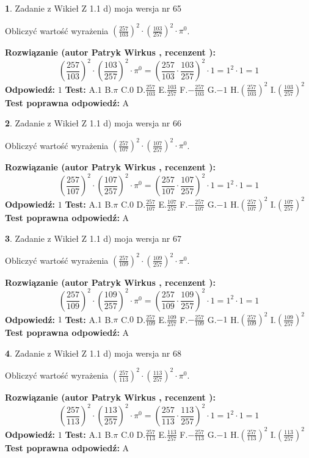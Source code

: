 \documentclass[12pt, a4paper]{article}
\theoremstyle{definition} %
\newtheorem{zad}{}
\newcommand{\zadStart}[1]{\begin{zad}#1\newline}
\newcommand{\zadStop}{\end{zad}}
\newcommand{\rozwStart}[2]{\noindent \textbf{Rozwiązanie (autor #1 , recenzent #2): }\newline}
\newcommand{\rozwStop}{\newline}
\newcommand{\odpStart}{\noindent \textbf{Odpowiedź:}\newline}
\newcommand{\odpStop}{\newline}
\newcommand{\testStart}{\noindent \textbf{Test:}\newline}
\newcommand{\testStop}{\newline}
\newcommand{\kluczStart}{\noindent \textbf{Test poprawna odpowiedź:}\newline}
\newcommand{\kluczStop}{\newline}
\begin{document}
\zadStart{Zadanie z Wikieł Z 1.1 d) moja wersja nr 65}

Obliczyć wartość wyrażenia $(\frac{257}{103})^{2} \cdot (\frac{103}{257})^{2} \cdot \pi^{0}$.
\zadStop
\rozwStart{Patryk Wirkus}{}
$$(\frac{257}{103})^{2} \cdot (\frac{103}{257})^{2} \cdot \pi^{0} = (\frac{257}{103} \cdot \frac{103}{257})^{2} \cdot 1 = 1^{2} \cdot 1 = 1$$
\rozwStop
\odpStart
$1$
\odpStop
\testStart
A.$1$ B.$\pi$ C.$0$ D.$\frac{257}{103}$ E.$\frac{103}{257}$
F.$-\frac{257}{103}$ G.$-1$
H.$(\frac{257}{103})^{2}$
I.$(\frac{103}{257})^{2}$
\testStop
\kluczStart
A
\kluczStop



\zadStart{Zadanie z Wikieł Z 1.1 d) moja wersja nr 66}

Obliczyć wartość wyrażenia $(\frac{257}{107})^{2} \cdot (\frac{107}{257})^{2} \cdot \pi^{0}$.
\zadStop
\rozwStart{Patryk Wirkus}{}
$$(\frac{257}{107})^{2} \cdot (\frac{107}{257})^{2} \cdot \pi^{0} = (\frac{257}{107} \cdot \frac{107}{257})^{2} \cdot 1 = 1^{2} \cdot 1 = 1$$
\rozwStop
\odpStart
$1$
\odpStop
\testStart
A.$1$ B.$\pi$ C.$0$ D.$\frac{257}{107}$ E.$\frac{107}{257}$
F.$-\frac{257}{107}$ G.$-1$
H.$(\frac{257}{107})^{2}$
I.$(\frac{107}{257})^{2}$
\testStop
\kluczStart
A
\kluczStop



\zadStart{Zadanie z Wikieł Z 1.1 d) moja wersja nr 67}

Obliczyć wartość wyrażenia $(\frac{257}{109})^{2} \cdot (\frac{109}{257})^{2} \cdot \pi^{0}$.
\zadStop
\rozwStart{Patryk Wirkus}{}
$$(\frac{257}{109})^{2} \cdot (\frac{109}{257})^{2} \cdot \pi^{0} = (\frac{257}{109} \cdot \frac{109}{257})^{2} \cdot 1 = 1^{2} \cdot 1 = 1$$
\rozwStop
\odpStart
$1$
\odpStop
\testStart
A.$1$ B.$\pi$ C.$0$ D.$\frac{257}{109}$ E.$\frac{109}{257}$
F.$-\frac{257}{109}$ G.$-1$
H.$(\frac{257}{109})^{2}$
I.$(\frac{109}{257})^{2}$
\testStop
\kluczStart
A
\kluczStop



\zadStart{Zadanie z Wikieł Z 1.1 d) moja wersja nr 68}

Obliczyć wartość wyrażenia $(\frac{257}{113})^{2} \cdot (\frac{113}{257})^{2} \cdot \pi^{0}$.
\zadStop
\rozwStart{Patryk Wirkus}{}
$$(\frac{257}{113})^{2} \cdot (\frac{113}{257})^{2} \cdot \pi^{0} = (\frac{257}{113} \cdot \frac{113}{257})^{2} \cdot 1 = 1^{2} \cdot 1 = 1$$
\rozwStop
\odpStart
$1$
\odpStop
\testStart
A.$1$ B.$\pi$ C.$0$ D.$\frac{257}{113}$ E.$\frac{113}{257}$
F.$-\frac{257}{113}$ G.$-1$
H.$(\frac{257}{113})^{2}$
I.$(\frac{113}{257})^{2}$
\testStop
\kluczStart
A
\kluczStop
\end{document}
